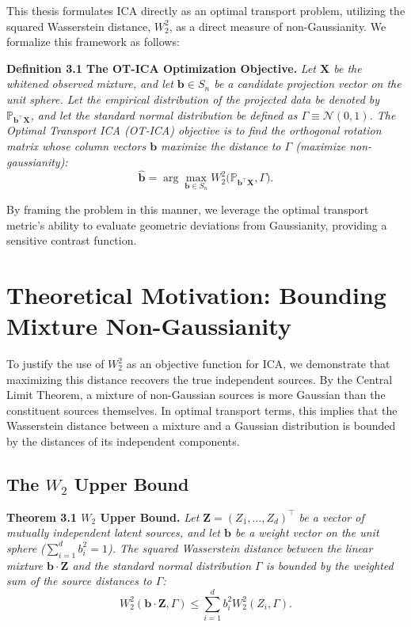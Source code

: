 \documentclass[12pt,a4paper,twoside,openany]{book}
\begin{document}
This thesis formulates ICA directly as an optimal transport problem, utilizing the squared Wasserstein distance, $W_2^2$, 
as a direct measure of non-Gaussianity. We formalize this framework as follows:

\vspace{0.5em}
\noindent\textbf{Definition 3.1 The OT-ICA Optimization Objective.} \textit{Let $\mathbf{X}$ be the whitened observed mixture, and 
let $\mathbf{b} \in S_n$ be a candidate projection vector on the unit sphere. Let the empirical distribution of the projected data be 
denoted by $\mathbb{P}_{\mathbf{b}^\top \mathbf{X}}$, and let the standard normal distribution be defined as $\Gamma \equiv \mathcal{N}(0,1)$. 
The Optimal Transport ICA (OT-ICA) objective is to find the orthogonal rotation matrix whose column vectors $\mathbf{b}$ maximize the distance to $\Gamma$ (maximize non-gaussianity):}
\begin{equation}
    \hat{\mathbf{b}} = \arg\max_{\mathbf{b} \in S_n} W_2^2\big(\mathbb{P}_{\mathbf{b}^\top \mathbf{X}}, \Gamma\big).
\end{equation}
\vspace{0.5em}

By framing the problem in this manner, we leverage the optimal transport metric's ability to evaluate geometric deviations from Gaussianity, providing a sensitive contrast function.

\section{Theoretical Motivation: Bounding Mixture Non-Gaussianity}
To justify the use of $W_2^2$ as an objective function for ICA, we demonstrate that maximizing this distance 
recovers the true independent sources. By the Central Limit Theorem, a mixture of non-Gaussian sources is more Gaussian 
than the constituent sources themselves. In optimal transport terms, this implies that the Wasserstein distance between a mixture 
and a Gaussian distribution is bounded by the distances of its independent components.

\subsection{The $W_2$ Upper Bound}

\vspace{0.5em}
\noindent\textbf{Theorem 3.1 $W_2$ Upper Bound.} \textit{Let $\mathbf{Z} = (Z_1, \dots, Z_d)^\top$ be 
a vector of mutually independent latent sources, and let $\mathbf{b}$ be a weight vector on the unit sphere ($\sum_{i=1}^d b_i^2 = 1$). 
The squared Wasserstein distance between the linear mixture $\mathbf{b} \cdot \mathbf{Z}$ and the 
standard normal distribution $\Gamma$ is bounded by the weighted sum of the source distances to $\Gamma$:}
\begin{equation}
    W_2^2(\mathbf{b} \cdot \mathbf{Z}, \Gamma) \le \sum_{i=1}^d b_i^2 W_2^2(Z_i, \Gamma).
\end{equation}
\end{document}

